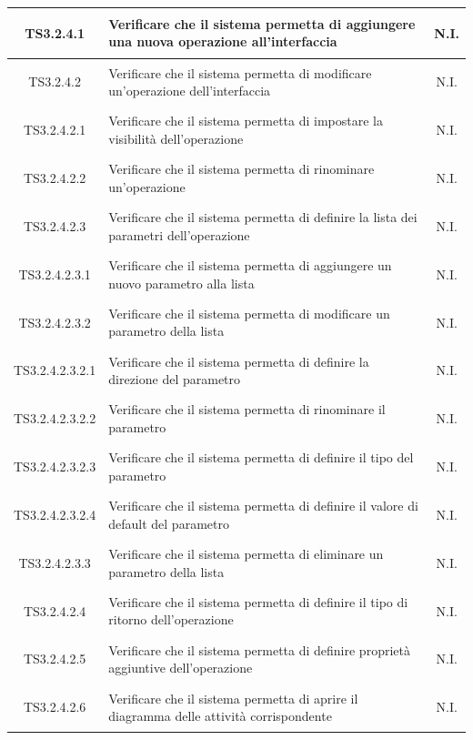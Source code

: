 \documentclass[../PianoDiQualifica.tex]{subfiles}
\begin{document}
\begin{longtable}{|c|>{\centering}p{10cm}|c|}
	\hline
	\hypertarget{TS3.2.4.1}{TS3.2.4.1} & Verificare che il sistema permetta di aggiungere una nuova operazione all'interfaccia & N.I. \\
	\hline
	\hypertarget{TS3.2.4.2}{TS3.2.4.2} & Verificare che il sistema permetta di modificare un'operazione dell'interfaccia & N.I. \\
	\hline
	\hypertarget{TS3.2.4.2.1}{TS3.2.4.2.1} & Verificare che il sistema permetta di impostare la visibilità dell'operazione & N.I. \\
	\hline
	\hypertarget{TS3.2.4.2.2}{TS3.2.4.2.2} & Verificare che il sistema permetta di rinominare un'operazione & N.I. \\
	\hline
	\hypertarget{TS3.2.4.2.3}{TS3.2.4.2.3} & Verificare che il sistema permetta di definire la lista dei parametri dell'operazione & N.I. \\
	\hline
	\hypertarget{TS3.2.4.2.3.1}{TS3.2.4.2.3.1} & Verificare che il sistema permetta di aggiungere un nuovo parametro alla lista & N.I. \\
	\hline
	\hypertarget{TS3.2.4.2.3.2}{TS3.2.4.2.3.2} & Verificare che il sistema permetta di modificare un parametro della lista & N.I. \\
	\hline
	\hypertarget{TS3.2.4.2.3.2.1}{TS3.2.4.2.3.2.1} & Verificare che il sistema permetta di definire la direzione del parametro & N.I. \\
	\hline
	\hypertarget{TS3.2.4.2.3.2.2}{TS3.2.4.2.3.2.2} & Verificare che il sistema permetta di rinominare il parametro & N.I. \\
	\hline
	\hypertarget{TS3.2.4.2.3.2.3}{TS3.2.4.2.3.2.3} & Verificare che il sistema permetta di definire il tipo del parametro & N.I. \\
	\hline
	\hypertarget{TS3.2.4.2.3.2.4}{TS3.2.4.2.3.2.4} & Verificare che il sistema permetta di definire il valore di default del parametro & N.I. \\
	\hline
	\hypertarget{TS3.2.4.2.3.3}{TS3.2.4.2.3.3} & Verificare che il sistema permetta di eliminare un parametro della lista & N.I. \\
	\hline
	\hypertarget{TS3.2.4.2.4}{TS3.2.4.2.4} & Verificare che il sistema permetta di definire il tipo di ritorno dell'operazione & N.I. \\
	\hline
	\hypertarget{TS3.2.4.2.5}{TS3.2.4.2.5} & Verificare che il sistema permetta di definire proprietà aggiuntive dell'operazione & N.I. \\
	\hline
	\hypertarget{TS3.2.4.2.6}{TS3.2.4.2.6} & Verificare che il sistema permetta di aprire il diagramma delle attività corrispondente & N.I. \\

\end{longtable}
\end{document}
